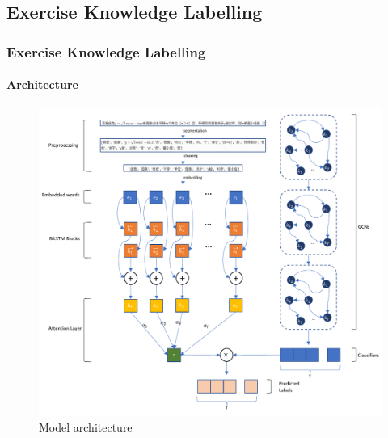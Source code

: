 \documentclass{beamer}
\begin{document}
\subsection{Exercise Knowledge Labelling}
\begin{frame}
  \frametitle{Exercise Knowledge Labelling}
  \framesubtitle{Architecture}
  \begin{figure}
    \includegraphics[height=0.8\textheight]{figures/ch2-model-architecture.pdf}
    \caption{Model architecture}\label{fig:ch2-archi}
  \end{figure}
\end{frame}
\end{document}
